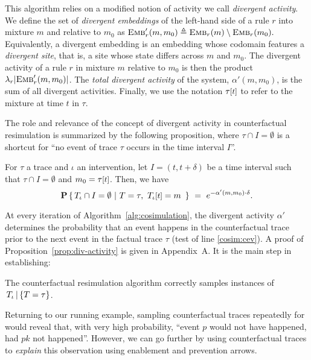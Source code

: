 This algorithm relies on a modified notion of activity we call
\emph{divergent activity}. We define the set of \emph{divergent
  embeddings} of the left-hand side of a rule $r$ into mixture $m$
and relative to $m_0$ as
${\textsc{Emb}}'_{r}(m, m_0) \triangleq {\textsc{Emb}}_{r}(m) \setminus {\textsc{Emb}}_{r}(m_0).$
Equivalently, a divergent embedding is an embedding whose codomain
features a \emph{divergent site}, that is, a site whose state differs
across $m$ and $m_0$. The {divergent activity} of a rule $r$ in
mixture $m$ relative to $m_0$ is then the product
$\lambda_r|{\textsc{Emb}}'_{r}(m, m_0)|$. The \emph{total divergent activity} of
the system, $\alpha'(m, m_0)$, is the sum of all divergent
activities. Finally, we use the notation $\TSTATE{t}{\tau}$ to refer
to the mixture at time $t$ in $\tau$.



The role and relevance of the concept of divergent activity in
counterfactual resimulation is summarized by the
following proposition, where $\tau \cap I = \emptyset$ is a
shortcut for ``no event of trace $\tau$ occurs in
the time interval $I$''.
\begin{proposition}\label{prop:div-activity}
  For $\tau$ a trace
  and $\iota$ an intervention, let $I = (t, t+\delta)$ be a time interval
  such that $\tau \cap I = \emptyset$ and $m_0 =
  \TSTATE{t}{\tau}$. Then, we have
  \[\CProb{ \ATRAJ{} \cap I = \emptyset }{ T=\tau,\
      \TSTATE{t}{\ATRAJ{}} = m\ }
    \ =\ e^{-\alpha'(m, m_0) \cdot \delta}.
  \]
\end{proposition}
\noindent At every iteration of Algorithm~\ref{alg:cosimulation}, the
divergent activity $\alpha'$ determines the probability that an event
happens in the counterfactual trace prior to the next event in the
factual trace $\tau$ (test of line \ref{cosim:cev}).  A proof of
Proposition~\ref{prop:div-activity} is given in
Appendix~A. %
It is the main step in establishing:

\begin{theorem}%
  The counterfactual resimulation algorithm correctly
  samples instances of $\,{T_\iota\,|\,\{T=\tau\}}{}$.
\end{theorem}



Returning to our running example, sampling counterfactual traces repeatedly for
\RefTrace{} would reveal that, with very high probability, ``event $p$ would not
have happened, had $pk$ not happened''. However, we can go further by using
counterfactual traces to \textit{explain} this observation using enablement and
prevention arrows.
